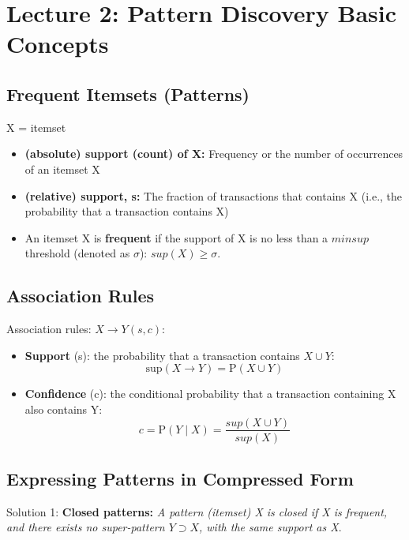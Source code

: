 \section{Lecture 2: Pattern Discovery Basic Concepts}
\subsection{Frequent Itemsets (Patterns)}

X = itemset

\begin{itemize}
\item \textbf{(absolute) support (count) of X:} Frequency or the number of occurrences of an itemset X
\item \textbf{(relative) support, s:} The fraction of transactions that contains X (i.e., the probability that a transaction contains X)
\item An itemset X is \textbf{frequent} if the support of X is no less than a $minsup$ threshold (denoted as $\sigma$): $sup(X) \geqslant \sigma$.
\end{itemize}

\subsection{Association Rules}
Association rules: $X \to Y (s, c)$:
\begin{itemize}
\item \textbf{Support} (s): the probability that a transaction contains $X \cup Y$:
\begin{equation*}
\mathrm{sup}(X \to Y) = \mathrm{P}(X \cup Y)
\end{equation*}

\item \textbf{Confidence} (c): the conditional probability that a transaction containing X also contains Y: 
\begin{equation*}
c = \mathrm{P}(Y \mid X) = \frac{sup(X \cup Y)}{sup(X)}
\end{equation*}
\end{itemize}

\subsection{Expressing Patterns in Compressed Form}
Solution 1: \textbf{Closed patterns:} \textit{A pattern (itemset) X is closed if X is frequent, and there exists no super-pattern $Y \supset X$, with the same support as X}.\\
    
